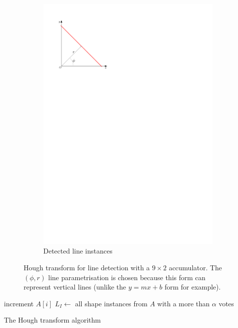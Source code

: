 \begin{figure}[htb]
\begin{subfigure}[b]{0.3\linewidth}
		\includegraphics[width=\textwidth,page=4]{figs/hough-transform.pdf}
		\caption{Detected line instances}
		\label{fig:hough-transform:e}
	\end{subfigure}
	\caption{Hough transform for line detection with a $9\times2$ accumulator. The $(\phi,r)$ line parametrisation is chosen because this form can represent vertical lines (unlike the $y=mx+b$ form for example).}
	\label{fig:hough-transform}
\end{figure}
\begin{algorithm} 
	
	 {
		{
			increment $A[i]$\;
		}
	}
	$L_I \leftarrow$ all shape instances from $A$ with a more than $\alpha$ votes\;
	\caption{The Hough transform algorithm}
	\label{algo:hough-transform}
\end{algorithm}
